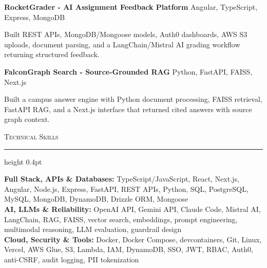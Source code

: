 \documentclass[letterpaper,11pt]{article}
\newcommand{\resumesection}[1]{%
  \par\vspace{2pt}%
  {\large\scshape #1}\par\vspace{2pt}%
  \hrule height 0.4pt\vspace{2pt}%
}
\newcommand{\projectHeading}[2]{
  \textbf{#1} \hfill #2
}
\begin{document}
\projectHeading{RocketGrader - AI Assignment Feedback Platform}{Angular, TypeScript, Express, MongoDB}
\begin{tightitemize}
  \item Built REST APIs, MongoDB/Mongoose models, Auth0 dashboards, AWS S3 uploads, document parsing, and a LangChain/Mistral AI grading workflow returning structured feedback.
\end{tightitemize}

\projectHeading{FalconGraph Search - Source-Grounded RAG}{Python, FastAPI, FAISS, Next.js}
\begin{tightitemize}
  \item Built a campus answer engine with Python document processing, FAISS retrieval, FastAPI RAG, and a Next.js interface that returned cited answers with source graph context.
\end{tightitemize}

\resumesection{Technical Skills}
\textbf{Full Stack, APIs \& Databases:} TypeScript/JavaScript, React, Next.js, Angular, Node.js, Express, FastAPI, REST APIs, Python, SQL, PostgreSQL, MySQL, MongoDB, DynamoDB, Drizzle ORM, Mongoose\\
\textbf{AI, LLMs \& Reliability:} OpenAI API, Gemini API, Claude Code, Mistral AI, LangChain, RAG, FAISS, vector search, embeddings, prompt engineering, multimodal reasoning, LLM evaluation, guardrail design\\
\textbf{Cloud, Security \& Tools:} Docker, Docker Compose, devcontainers, Git, Linux, Vercel, AWS Glue, S3, Lambda, IAM, DynamoDB, SSO, JWT, RBAC, Auth0, anti-CSRF, audit logging, PII tokenization
\end{document}
